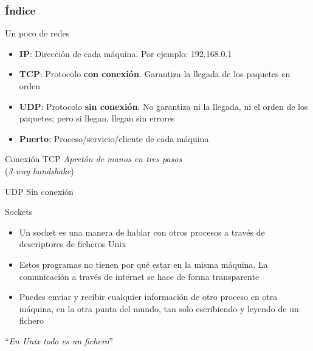 \documentclass{mybeamer}
\institute{
	{\textsl{\large Tema 15}}
	\\[1em]
	\textbf{\Large Sockets}
}
\begin{document}
\begin{frame}
\titlepage
\end{frame}

\begin{frame}
\frametitle{Índice}
	\tableofcontents
\end{frame}

\begin{framesec}[redes]{Un poco de redes}
	\begin{itemize}
		\item \textbf{IP}: Dirección de cada máquina. Por ejemplo: 192.168.0.1
		\item \textbf{TCP}: Protocolo \textbf{con conexión}. Garantiza
			la llegada de los paquetes en orden
		\item \textbf{UDP}: Protocolo \textbf{sin conexión}. No
			garantiza ni la llegada, ni el orden de los paquetes;
			pero si llegan, llegan sin errores
		\item \textbf{Puerto}: Proceso/servicio/cliente de cada máquina
	\end{itemize}
\end{framesec}

\begin{framesec}{Conexión TCP}
	\centering \Large \textit{Apretón de manos en tres pasos}\\
	(\textit{3-way handshake})
	\\[2em]
\end{framesec}

\begin{framesec}{UDP}
	\centering \Large Sin conexión
	\\[2em]
\end{framesec}

\begin{framesec}{Sockets}
	\begin{itemize}
		\item Un socket es una manera de hablar con otros procesos a
			través de descriptores de ficheros Unix
		\item Estos programas no tienen por qué estar en la misma
			máquina. La comunicación a través de internet se hace de
			forma transparente
		\item Puedes enviar y recibir cualquier información de otro
			proceso en otra máquina, en la otra punta del mundo, tan
			solo escribiendo y leyendo de un fichero
	\end{itemize}

	\vspace{1em}
	\centering ``\textit{En Unix todo es un fichero}''
\end{framesec}
\end{document}
